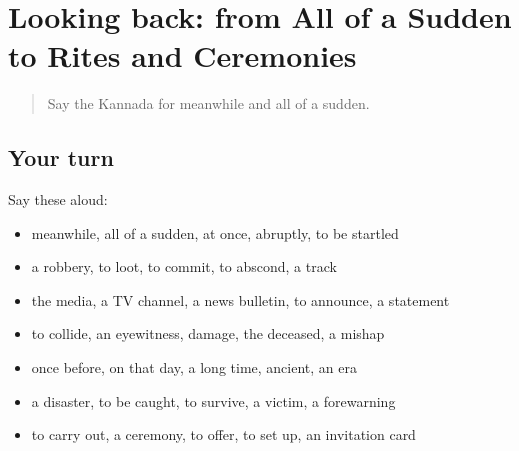 \section[(dialogue)]{Looking back: from All of a Sudden to Rites and Ceremonies}

\label{lesson:KA-R333-review-327-333}



\begin{quote}
Say the Kannada for meanwhile and all of a sudden.
\end{quote}

\subsection*{Your turn}
Say these aloud:

\begin{itemize}
\raggedright
  \item meanwhile, all of a sudden, at once, abruptly, to be startled
  \item a robbery, to loot, to commit, to abscond, a track
  \item the media, a TV channel, a news bulletin, to announce, a statement
  \item to collide, an eyewitness, damage, the deceased, a mishap
  \item once before, on that day, a long time, ancient, an era
  \item a disaster, to be caught, to survive, a victim, a forewarning
  \item to carry out, a ceremony, to offer, to set up, an invitation card
\end{itemize}

